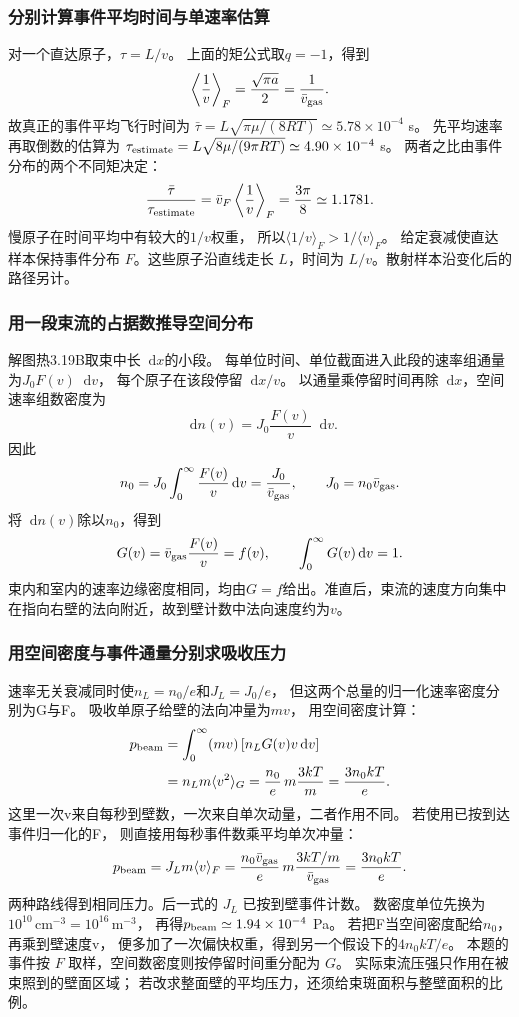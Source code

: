 \documentclass[UTF8,fontset=fandol,a4paper,11pt]{ctexart}
\newcommand{\dd}{\mathop{}\!\mathrm{d}}
\begin{document}
\subsubsection*{分别计算事件平均时间与单速率估算}
对一个直达原子，$\tau=L/v$。
上面的矩公式取$q=-1$，得到
\[
\left\langle\frac1v\right\rangle_F
=\frac{\sqrt{\pi a}}2
=\frac1{\bar v_{\rm gas}}.
\]
故真正的事件平均飞行时间为
$\bar\tau=L\sqrt{\pi\mu/(8RT)}\simeq5.78\times10^{-4}$ s。
先平均速率再取倒数的估算为
$\tau_{\rm estimate}=L\sqrt{8\mu/(9\pi RT)}
\simeq4.90\times10^{-4}$ s。
两者之比由事件分布的两个不同矩决定：
\[
\frac{\bar\tau}{\tau_{\rm estimate}}
=\bar v_F\left\langle\frac1v\right\rangle_F
=\frac{3\pi}{8}\simeq1.1781.
\]
慢原子在时间平均中有较大的$1/v$权重，
所以$\langle1/v\rangle_F>1/\langle v\rangle_F$。
给定衰减使直达样本保持事件分布 $F$。这些原子沿直线走长 $L$，时间为 $L/v$。散射样本沿变化后的路径另计。

\subsubsection*{用一段束流的占据数推导空间分布}
解图热3.19B取束中长$\dd x$的小段。
每单位时间、单位截面进入此段的速率组通量为$J_0F(v)\dd v$，
每个原子在该段停留$\dd x/v$。
以通量乘停留时间再除$\dd x$，空间速率组数密度为
\[
\dd n(v)=J_0\frac{F(v)}v\dd v.
\]
因此
\[
n_0=J_0\int_0^\infty\frac{F(v)}v\dd v
=\frac{J_0}{\bar v_{\rm gas}},\qquad
J_0=n_0\bar v_{\rm gas}.
\]
将$\dd n(v)$除以$n_0$，得到
\[
G(v)=\bar v_{\rm gas}\frac{F(v)}v=f(v),\qquad
\int_0^\infty G(v)\dd v=1.
\]
束内和室内的速率边缘密度相同，均由$G=f$给出。准直后，束流的速度方向集中在指向右壁的法向附近，故到壁计数中法向速度约为$v$。

\subsubsection*{用空间密度与事件通量分别求吸收压力}
速率无关衰减同时使$n_L=n_0/e$和$J_L=J_0/e$，
但这两个总量的归一化速率密度分别为G与F。
吸收单原子给壁的法向冲量为$mv$，
用空间密度计算：
\[
\begin{aligned}
p_{\rm beam}
&=\int_0^\infty (mv)\,[n_LG(v)v\dd v]\\
&=n_Lm\langle v^2\rangle_G
=\frac{n_0}{e}\,m\frac{3kT}{m}
=\frac{3n_0kT}{e}.
\end{aligned}
\]
这里一次v来自每秒到壁数，一次来自单次动量，二者作用不同。
若使用已按到达事件归一化的F，
则直接用每秒事件数乘平均单次冲量：
\[
p_{\rm beam}=J_Lm\langle v\rangle_F
=\frac{n_0\bar v_{\rm gas}}e\,
m\frac{3kT/m}{\bar v_{\rm gas}}
=\frac{3n_0kT}{e}.
\]
两种路线得到相同压力。后一式的 $J_L$ 已按到壁事件计数。
数密度单位先换为
$10^{10}\,\mathrm{cm^{-3}}=10^{16}\,\mathrm{m^{-3}}$，
再得$p_{\rm beam}\simeq1.94\times10^{-4}$ Pa。
若把F当空间密度配给$n_0$，再乘到壁速度v，
便多加了一次偏快权重，得到另一个假设下的$4n_0kT/e$。
本题的事件按 $F$ 取样，空间数密度则按停留时间重分配为 $G$。
实际束流压强只作用在被束照到的壁面区域；
若改求整面壁的平均压力，还须给束斑面积与整壁面积的比例。
\end{document}
